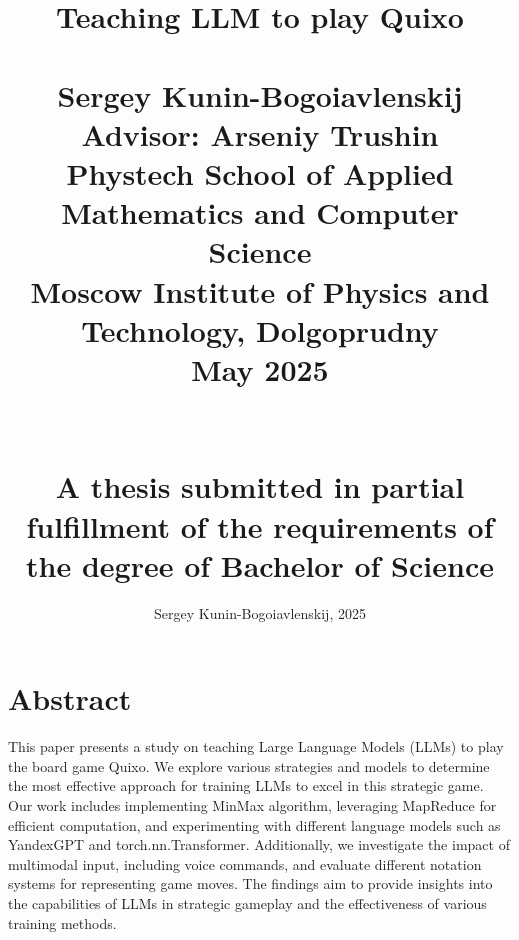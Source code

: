 \documentclass[12pt,fleqn]{graphicsclass}
\title{
{\textbf{Teaching LLM to play Quixo}}\\~\\
{\large \textbf{Sergey Kunin-Bogoiavlenskij}}\\
{\large Advisor: \textbf{Arseniy Trushin}}\\
{\large Phystech School of Applied Mathematics and Computer Science \\ 
	Moscow Institute of Physics and Technology, Dolgoprudny \\ 
	May 2025 \\~\\~\\
	A thesis submitted in partial fulfillment of the requirements of the degree of Bachelor of Science }\\
}
\author{\textcopyright Sergey Kunin-Bogoiavlenskij, 2025}
\date{}
\begin{document}
\maketitle


\chapter*{Abstract}
\label{sec:engAbstract}

	This paper presents a study on teaching Large Language Models (LLMs) to play the board game Quixo. 
	We explore various strategies and models to determine the most effective approach for training LLMs to excel in this strategic game. 
	Our work includes implementing MinMax algorithm, leveraging MapReduce for efficient computation, and experimenting with different language models such as YandexGPT and torch.nn.Transformer. 
	Additionally, we investigate the impact of multimodal input, including voice commands, and evaluate different notation systems for representing game moves. 
	The findings aim to provide insights into the capabilities of LLMs in strategic gameplay and the effectiveness of various training methods. 
\vspace{1em}






%


\tableofcontents

\clearpage 
{} %



%
%

%

\nocite{*}

\end{document}
